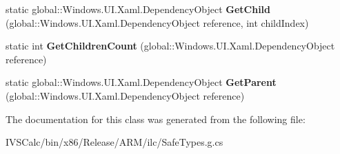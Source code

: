 \begin{DoxyCompactItemize}
\item 
\mbox{\label{class_windows_1_1_u_i_1_1_xaml_1_1_media_1_1_visual_tree_helper_a3a4a777df4fdf53b1c650f8072c9cdf7}} 
static global\+::\+Windows.\+U\+I.\+Xaml.\+Dependency\+Object {\bfseries Get\+Child} (global\+::\+Windows.\+U\+I.\+Xaml.\+Dependency\+Object reference, int child\+Index)
\item 
\mbox{\label{class_windows_1_1_u_i_1_1_xaml_1_1_media_1_1_visual_tree_helper_a9856a6b0d01e09cdc7047af1d0dc4188}} 
static int {\bfseries Get\+Children\+Count} (global\+::\+Windows.\+U\+I.\+Xaml.\+Dependency\+Object reference)
\item 
\mbox{\label{class_windows_1_1_u_i_1_1_xaml_1_1_media_1_1_visual_tree_helper_a9aac21ec03d8e2464c23d385bb664a28}} 
static global\+::\+Windows.\+U\+I.\+Xaml.\+Dependency\+Object {\bfseries Get\+Parent} (global\+::\+Windows.\+U\+I.\+Xaml.\+Dependency\+Object reference)
\end{DoxyCompactItemize}


The documentation for this class was generated from the following file\+:\begin{DoxyCompactItemize}
\item 
I\+V\+S\+Calc/bin/x86/\+Release/\+A\+R\+M/ilc/Safe\+Types.\+g.\+cs\end{DoxyCompactItemize}
